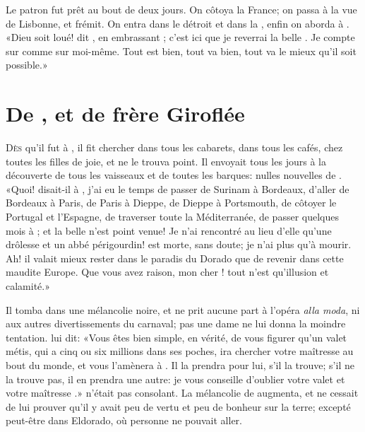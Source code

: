 Le patron fut prêt au bout de deux jours. On côtoya la France; on passa
à la vue de Lisbonne, et  frémit. On entra dans le détroit et
dans la , enfin on aborda à  . «Dieu soit loué! dit
, en embrassant ; c’est ici que je reverrai la belle
. Je compte sur  comme sur moi-même. Tout est bien,
tout va bien, tout va le mieux qu’il soit possible.»


\chapter{De , et de frère Giroflée}


\lettrine{D}{ès} qu’il fut à  , il fit chercher  dans tous les cabarets,
dans tous les cafés, chez toutes les filles de joie, et ne le trouva
point. Il envoyait tous les jours à la découverte de tous les vaisseaux
et de toutes les barques: nulles nouvelles de . «Quoi! disait-il
à , j’ai eu le temps de passer de Surinam à Bordeaux, d’aller de
Bordeaux à Paris, de Paris à Dieppe, de Dieppe à Portsmouth, de côtoyer
le Portugal et l’Espagne, de traverser toute la Méditerranée, de passer
quelques mois à  ; et la belle  n’est point venue! Je
n’ai rencontré au lieu d’elle qu’une drôlesse et un abbé périgourdin!
 est morte, sans doute; je n’ai plus qu’à mourir. Ah! il
valait mieux rester dans le paradis du Dorado que de revenir dans cette
maudite Europe. Que vous avez raison, mon cher ! tout n’est
qu’illusion et calamité.»

Il tomba dans une mélancolie noire, et ne prit aucune part à l’opéra
\emph{alla moda}, ni aux autres divertissements du carnaval; pas une dame ne
lui donna la moindre 
tentation.  lui dit: «Vous êtes bien simple,
en vérité, de vous figurer qu’un valet métis, qui a cinq ou six
millions dans ses poches, ira chercher votre maîtresse au bout du
monde, et vous l’amènera à  . Il la prendra pour lui, s’il la
trouve; s’il ne la trouve pas, il en prendra une autre: je vous
conseille d’oublier votre valet  et votre maîtresse .»
 n’était pas consolant. La mélancolie de  augmenta, et
 ne cessait de lui prouver qu’il y avait peu de vertu et peu de
bonheur sur la terre; excepté peut-être dans Eldorado, où personne
ne pouvait aller.



